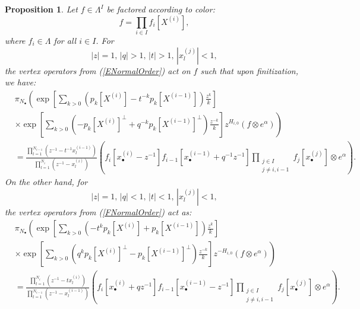 \documentclass[10pt,a4paper]{amsart}
\newtheorem{prop}{Proposition}
\begin{document}
\begin{prop}\label{FiniteVert}
    Let $f\in\Lambda^I$ be factored according to color:
    \[
    f= \prod_{i\in I} f_i[X^{(i)}],
    \]
    where $f_i\in\Lambda$ for all $i\in I$.
    For
    \begin{equation}
    |z|=1,\, |q|>1,\, |t|>1,\, |x_{l}^{(j)}|<1,
    \label{EExpand0}
    \end{equation}
    the vertex operators from (\ref{ENormalOrder}) act on $f$ such that upon finitization, we have:
\begin{equation}
\label{FinEVertex}
    \begin{aligned}
    &\pi_{N_\bullet} \left(\exp\left[ \sum_{k>0}\left( p_k[X^{(i)}]-t^{-k}p_k[X^{(i-1)}] \right) \frac{z^k}{k}\right]\right.\\
    &\times\left.\exp\left[\sum_{k>0}\left( -p_k[X^{(i)}]^\perp+q^{-k}p_k[X^{(i-1)}]^\perp \right)\frac{z^{-k}}{k}  \right]z^{H_{i,0}} (f\otimes e^\alpha)\right) \\
    &=
    \frac{\displaystyle\prod_{l=1}^{N_{i-1}}\left(z^{-1}-t^{-1}x_{l}^{(i-1)}\right)}{\displaystyle\prod_{l=1}^{N_i} \left(z^{-1}-x_{l}^{(i)}\right)}
    \left( f_i\left[x_{\bullet}^{(i)}-z^{-1}\right]f_{i-1}\left[x_{\bullet}^{(i-1)}+q^{-1}z^{-1}\right]
    \prod_{\substack{j\in I\\j\not=i,i-1}} f_j\left[x_{\bullet}^{(j)}\right]\otimes e^\alpha\right).
    \end{aligned}
\end{equation}
    On the other hand, for
    \begin{equation*}
    |z|=1,\, |q|<1,\, |t|<1,\, |x_{l}^{(j)}|<1,
    \label{FExpand0}
    \end{equation*}
    the vertex operators from (\ref{FNormalOrder}) act as:
\begin{equation}
\label{FinFVertex}
    \begin{aligned}
    &\pi_{N_\bullet} \left(\exp\left[ \sum_{k>0}\left( -t^kp_k[X^{(i)}]+p_k[X^{(i-1)}] \right) \frac{z^k}{k}\right]\right.\\
    &\times \left.\exp\left[\sum_{k>0}\left( q^kp_k[X^{(i)}]^\perp-p_k[X^{(i-1)}]^\perp \right)\frac{z^{-k}}{k}  \right]z^{-H_{i,0}} (f\otimes e^\alpha)\right) \\
    &=
    \frac{\displaystyle\prod_{l=1}^{N_{i}}\left(z^{-1}-tx_{l}^{(i)}\right)}
    {\displaystyle\prod_{l=1}^{N_{i-1}} \left(z^{-1}-x_{l}^{(i-1)}\right)}
    \left( f_i\left[x_{\bullet}^{(i)}+qz^{-1}\right]f_{i-1}\left[x_{\bullet}^{(i-1)}-z^{-1}\right]
    \prod_{\substack{j\in I\\j\not=i,i-1}} f_j\left[x_{\bullet}^{(j)}\right]\otimes e^\alpha\right).
    \end{aligned}
\end{equation}
\end{prop}
\end{document}
